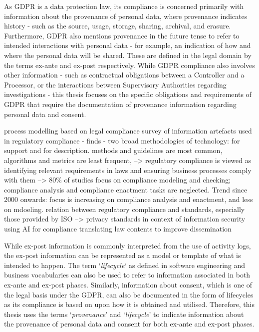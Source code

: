 As GDPR is a data protection law, its compliance is concerned primarily with information about the provenance of personal data, where provenance indicates history - such as the source, usage, storage, sharing, archival, and erasure. Furthermore, GDPR also mentions provenance in the future tense to refer to intended interactions with personal data - for example, an indication of how and where the personal data will be shared. These are defined in the legal domain by the terms ex-ante and ex-post respectively.
While GDPR compliance also involves other information - such as contractual obligations between a Controller and a Processor, or the interactions between Supervisory Authorities regarding investigations - this thesis focuses on the specific obligations and requirements of GDPR that require the documentation of provenance information regarding personal data and consent.

\cite{casanovas_european_2016}

\cite{sadiq_modeling_2007} process modelling based on legal compliance
\cite{benyoucef_information_2015} survey of information artefacts used in regulatory compliance - finds - two broad methodologies of technology: for support and for description. methods and guidelines are most common, algorithms and metrics are least frequent, --> regulatory compliance is viewed as identifying relevant requirements in laws and ensuring business processes comply with them --> 80\% of studies focus on compliance modeling and checking; compliance analysis and compliance enactment tasks are neglected. Trend since 2000 onwards: focus is increasing on compliance analysis and enactment, and less on mdoeling.
\cite{drogkaris_guidance_2018} relation between regulatory compliance and standards, especially those provided by ISO --> privacy standards in context of information security
\cite{kingston_using_2017} using AI for compliance
\cite{mommers_understanding_2009} translating law contents to improve dissemination



While ex-post information is commonly interpreted from the use of activity logs, the ex-post information can be represented as a model or template of what is intended to happen. The term `\textit{lifecycle}` as defined in software engineering and business vocabularies can also be used to refer to information associated in both ex-ante and ex-post phases. Similarly, information about consent, which is one of the legal basis under the GDPR,  can also be documented in the form of lifecycles as its compliance is based on upon how it is obtained and utilised. Therefore, this thesis uses the terms `\textit{provenance}' and `\textit{lifecycle}' to indicate information about the provenance of personal data and consent for both ex-ante and ex-post phases.

